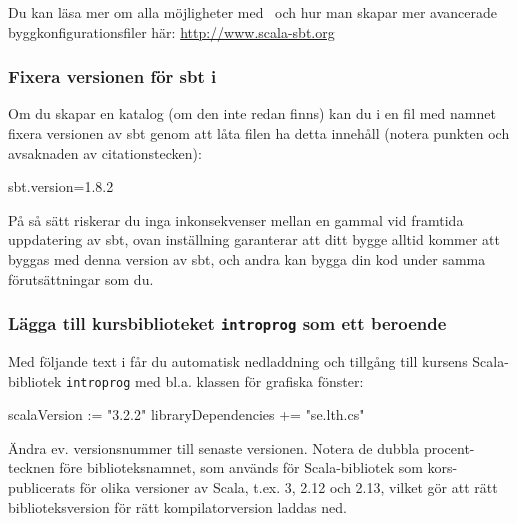 \noindent Du kan läsa mer om alla möjligheter med \sbt\ och hur man skapar mer avancerade byggkonfigurationsfiler här: \url{http://www.scala-sbt.org}


\subsubsection{Fixera versionen för sbt i }
Om du skapar en katalog  (om den inte redan finns) kan du i en fil med namnet  fixera versionen av sbt genom att låta filen ha detta innehåll (notera punkten och avsaknaden av citationstecken):
\begin{Code}
sbt.version=1.8.2
\end{Code}
På så sätt riskerar du inga inkonsekvenser mellan en gammal  vid framtida uppdatering av sbt, ovan inställning garanterar att ditt bygge alltid kommer att byggas med denna version av sbt, och andra kan bygga din kod under samma förutsättningar som du.

\subsubsection{Lägga till kursbiblioteket \texttt{introprog} som ett beroende}

Med följande text i  får du automatisk nedladdning och tillgång till kursens Scala-bibliotek \texttt{introprog} med bl.a. klassen  för grafiska fönster:

\begin{Code}
scalaVersion := "3.2.2"
libraryDependencies += "se.lth.cs" %
\end{Code}
Ändra ev. versionsnummer till senaste versionen. Notera de dubbla procent-tecknen före biblioteksnamnet, som används för Scala-bibliotek som kors-publicerats för olika versioner av Scala, t.ex. 3, 2.12 och 2.13, vilket gör att rätt biblioteksversion för rätt kompilatorversion laddas ned.


